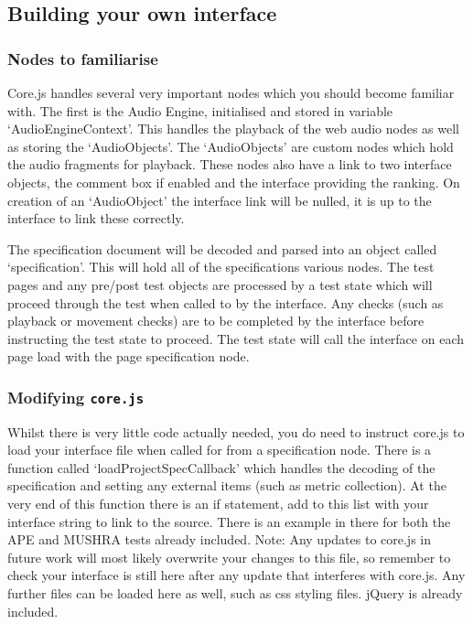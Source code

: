 \documentclass[11pt, oneside]{article}   	%
\begin{document}
	\subsection{Building your own interface}

		\subsubsection{Nodes to familiarise}
			Core.js handles several very important nodes which you should become familiar with. The first is the Audio Engine, initialised and stored in variable `AudioEngineContext'. This handles the playback of the web audio nodes as well as storing the `AudioObjects'. The `AudioObjects' are custom nodes which hold the audio fragments for playback. These nodes also have a link to two interface objects, the comment box if enabled and the interface providing the ranking. On creation of an `AudioObject' the interface link will be nulled, it is up to the interface to link these correctly.

			The specification document will be decoded and parsed into an object called `specification'. This will hold all of the specifications various nodes. The test pages and any pre/post test objects are processed by a test state which will proceed through the test when called to by the interface. Any checks (such as playback or movement checks) are to be completed by the interface before instructing the test state to proceed. The test state will call the interface on each page load with the page specification node.

		\subsubsection{Modifying \texttt{core.js}}
			Whilst there is very little code actually needed, you do need to instruct core.js to load your interface file when called for from a specification node. There is a function called `loadProjectSpecCallback' which handles the decoding of the specification and setting any external items (such as metric collection). At the very end of this function there is an if statement, add to this list with your interface string to link to the source. There is an example in there for both the APE and MUSHRA tests already included. Note: Any updates to core.js in future work will most likely overwrite your changes to this file, so remember to check your interface is still here after any update that interferes with core.js.
			Any further files can be loaded here as well, such as css styling files. jQuery is already included.
\end{document}
